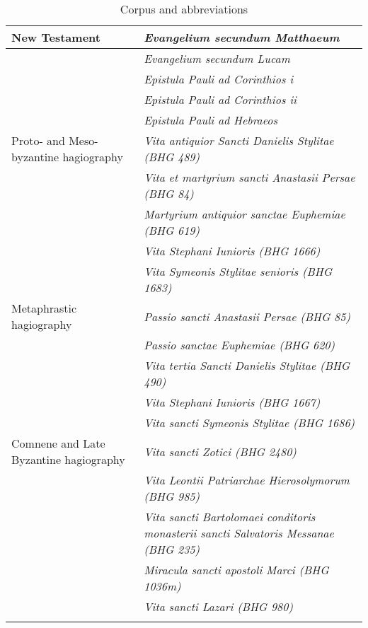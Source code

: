 \documentclass[output=paper,colorlinks,citecolor=brown]{langscibook}
\begin{document}

\begin{table}[p]
  \caption{Corpus and abbreviations}
  \label{tbl:vc:1}
\small
\begin{tabularx}{\textwidth}{>{\raggedright\arraybackslash}X>{\raggedright\arraybackslash}X}
\lsptoprule
New Testament & \emph{Evangelium secundum Matthaeum}\\
\midrule
 & \emph{Evangelium secundum Lucam}\\\cmidrule(rl){2-2}
 & \emph{Epistula Pauli ad Corinthios i}\\\cmidrule(rl){2-2}
 & \emph{Epistula Pauli ad Corinthios ii}\\\cmidrule(rl){2-2}
 & \emph{Epistula Pauli ad Hebraeos}\\
\midrule
Proto- and Meso-byzantine hagiography & \emph{Vita antiquior Sancti Danielis Stylitae (BHG 489)}\\\cmidrule(rl){2-2}
 & \emph{Vita et martyrium sancti Anastasii Persae (BHG 84)}\\\cmidrule(rl){2-2}
 & \emph{Martyrium antiquior sanctae Euphemiae (BHG 619)}\\\cmidrule(rl){2-2}
 & \emph{Vita Stephani Iunioris (BHG 1666)}\\\cmidrule(rl){2-2}
 & \emph{Vita Symeonis Stylitae senioris (BHG 1683)}\\
\midrule
Metaphrastic hagiography & \emph{Passio sancti Anastasii Persae (BHG 85)}\\\cmidrule(rl){2-2}
 & \emph{Passio sanctae Euphemiae (BHG 620)}\\\cmidrule(rl){2-2}
 & \emph{Vita tertia Sancti Danielis Stylitae (BHG 490)}\\\cmidrule(rl){2-2}
 & \emph{Vita Stephani Iunioris (BHG 1667)}\\\cmidrule(rl){2-2}
 & \emph{Vita sancti Symeonis Stylitae (BHG 1686)}\\
\midrule
Comnene and Late Byzantine hagiography & \emph{Vita sancti Zotici (BHG 2480)}\\\cmidrule(rl){2-2}
 & \emph{Vita Leontii Patriarchae Hierosolymorum (BHG 985)}\\\cmidrule(rl){2-2}
 & \emph{Vita sancti Bartolomaei conditoris monasterii sancti Salvatoris Messanae (BHG 235)}\\\cmidrule(rl){2-2}
 & \emph{Miracula sancti apostoli Marci (BHG 1036m)}\\\cmidrule(rl){2-2}
 & \emph{Vita sancti Lazari (BHG 980)}\\
\lspbottomrule
\end{tabularx}
\end{table}
\end{document}
